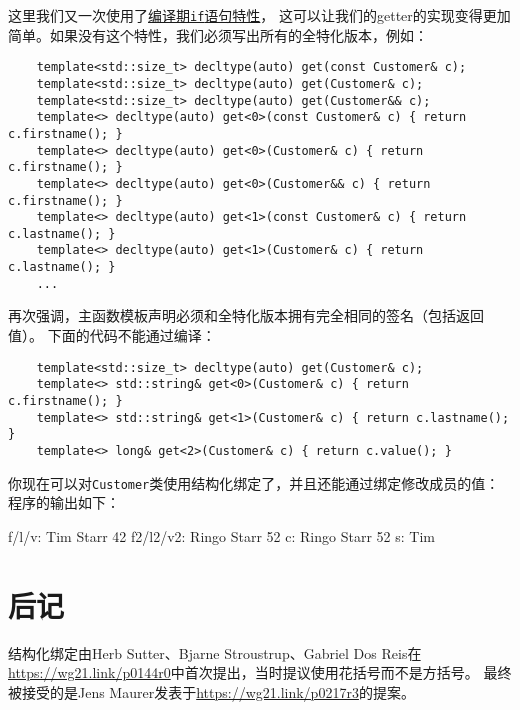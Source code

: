 这里我们又一次使用了\hyperref[ch10]{编译期\texttt{if}语句特性}，
这可以让我们的getter的实现变得更加简单。如果没有这个特性，我们必须写出所有的全特化版本，例如：
\begin{lstlisting}
    template<std::size_t> decltype(auto) get(const Customer& c);
    template<std::size_t> decltype(auto) get(Customer& c);
    template<std::size_t> decltype(auto) get(Customer&& c);
    template<> decltype(auto) get<0>(const Customer& c) { return c.firstname(); }
    template<> decltype(auto) get<0>(Customer& c) { return c.firstname(); }
    template<> decltype(auto) get<0>(Customer&& c) { return c.firstname(); }
    template<> decltype(auto) get<1>(const Customer& c) { return c.lastname(); }
    template<> decltype(auto) get<1>(Customer& c) { return c.lastname(); }
    ...
\end{lstlisting}
再次强调，主函数模板声明必须和全特化版本拥有完全相同的签名（包括返回值）。
下面的代码不能通过编译：
\begin{lstlisting}
    template<std::size_t> decltype(auto) get(Customer& c);
    template<> std::string& get<0>(Customer& c) { return c.firstname(); }
    template<> std::string& get<1>(Customer& c) { return c.lastname(); }
    template<> long& get<2>(Customer& c) { return c.value(); }
\end{lstlisting}
你现在可以对\texttt{Customer}类使用结构化绑定了，并且还能通过绑定修改成员的值：
程序的输出如下：
\begin{blacklisting}
    f/l/v:    Tim Starr 42
    f2/l2/v2: Ringo Starr 52
    c:        Ringo Starr 52
    s:        Tim
\end{blacklisting}

\section{后记}
结构化绑定由Herb Sutter、Bjarne Stroustrup、Gabriel Dos Reis在
\url{https://wg21.link/p0144r0}中首次提出，当时提议使用花括号而不是方括号。
最终被接受的是Jens Maurer发表于\url{https://wg21.link/p0217r3}的提案。